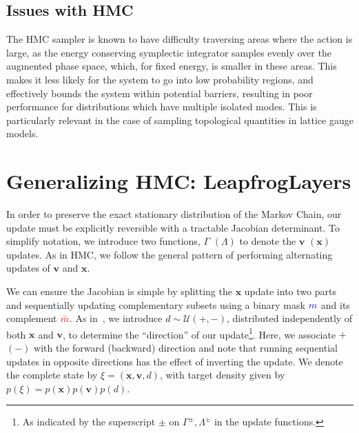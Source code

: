 \documentclass[a4paper,11pt]{article}
\newcommand{\x}{\mathbf{x}}
\newcommand{\p}{\mathbf{v}}
\newcommand{\mask}{\textcolor{blue}{{m}}}
\newcommand{\maskbar}{\textcolor{red}{\bar{m}}}
\begin{document}
\subsection{\label{subsec:hmc_issues}Issues with HMC}
%
The HMC sampler is known to have difficulty traversing areas
where the action is large,
as the energy conserving symplectic integrator samples evenly over the
augmented phase space, which, for fixed energy, is smaller
in these areas.
%
This makes it less likely for the system to go into low probability regions,
and effectively bounds the system within potential barriers,
resulting in poor performance for distributions which have
multiple isolated modes.
%
This is particularly relevant in the case of sampling topological quantities in
lattice gauge models.
%
\section{\label{sec:l2hmc}Generalizing HMC: LeapfrogLayers}
%
In order to preserve the exact stationary distribution of the Markov Chain, our update must be
explicitly reversible with a tractable Jacobian determinant.
%
To simplify notation, we introduce two functions, \(\Gamma\) \((\Lambda)\) to
denote the \(\p\) \((\x)\) updates.
%
As in HMC, we follow the general pattern of performing alternating updates of
\(\p\) and \(\x\).
%

We can ensure
the Jacobian is simple
by splitting the \(\x\) update into two
parts and sequentially updating complementary subsets using a binary mask
\(\mask\) and its complement \(\maskbar\).
%
As in~\cite{2017arXiv171109268L}, we introduce \(d \sim \mathcal{U} (+, -)\),
distributed independently of both \(\x\) and \(\p\), to determine the
``direction'' of our update\footnote{%
  As indicated by the superscript \(\pm\) on \(\Gamma^{\pm}, \Lambda^{\pm}\) in
  the update functions.
}.
%
Here, we associate \(+\) \((-)\) with the forward (backward) direction and note
that running sequential updates in opposite directions has the effect of
inverting the update.
%
We denote the complete state by \(\xi = (\x, \p, d)\), with target density
given by \(p(\xi) = p(\x) p(\p) p(d)\).
%
\end{document}

